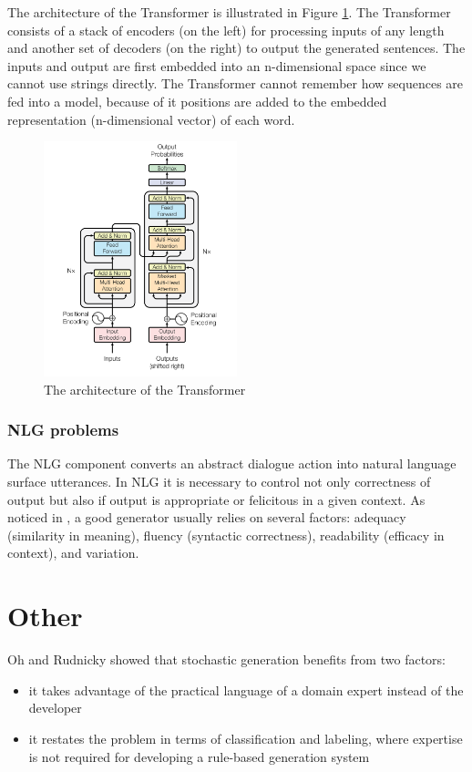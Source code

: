 The architecture of the Transformer is illustrated in Figure \ref{transformer}. The Transformer consists of a stack of encoders (on the left) for processing inputs of any length and another set of decoders (on the right) to output the generated sentences. The inputs and output are first embedded into an n-dimensional space since we cannot use strings directly. The Transformer cannot remember how sequences are fed into a model, because of it positions are added to the embedded representation (n-dimensional vector) of each word.

\begin{figure}[hbt]
  \centering
  \includegraphics[width=0.5\textwidth]{figures/transformer.png}
  \caption{The architecture of the Transformer\cite{transformer}}
  \label{transformer}
\end{figure}

\subsection*{NLG problems}
The NLG component converts an abstract dialogue action into natural language surface utterances. In NLG it is necessary to control not only correctness of output but also if output is appropriate or felicitous in a given context. As noticed in \cite{generator_problems}, a good generator usually relies on several factors: adequacy (similarity in meaning), fluency (syntactic correctness), readability (efficacy in context), and variation.

\chapter{Other}
Oh and Rudnicky showed that stochastic generation benefits from two factors: 
\begin{itemize}
  \item it takes advantage of the practical language of a domain expert instead of the developer
  \item it restates the problem in terms of classification and labeling, where expertise is not required for developing a rule-based generation system
\end{itemize}

